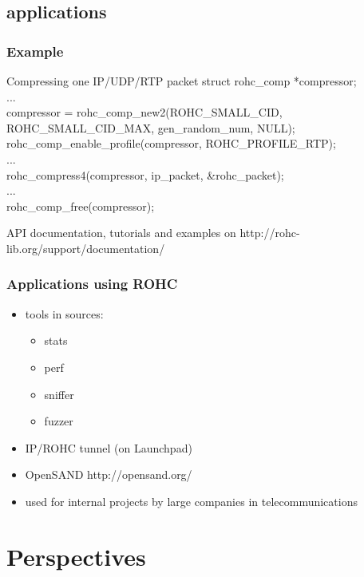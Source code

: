 \documentclass[utf8]{beamer}
\begin{document}
\subsection{applications}
\begin{frame}
	\frametitle{Example}
	\begin{block}{Compressing one IP/UDP/RTP packet}
	\tiny
	struct rohc\_comp *compressor;\\
	...\\
	compressor = rohc\_comp\_new2(ROHC\_SMALL\_CID, ROHC\_SMALL\_CID\_MAX,
	                              gen\_random\_num, NULL);\\
	rohc\_comp\_enable\_profile(compressor, ROHC\_PROFILE\_RTP);\\
	...\\
	rohc\_compress4(compressor, ip\_packet, \&rohc\_packet);\\
	...\\
	rohc\_comp\_free(compressor);\\
	\end{block}
	API documentation, tutorials and examples on http://rohc-lib.org/support/documentation/
\end{frame}
\begin{frame}
	\frametitle{Applications using ROHC}
	\begin{itemize}
		\item tools in sources:
			\begin{itemize}
				\item stats
				\item perf
				\item sniffer
				\item fuzzer
			\end{itemize}
		\item IP/ROHC tunnel (on Launchpad)
		\item OpenSAND {\tiny http://opensand.org/}
		\item used for internal projects by large companies in telecommunications
	\end{itemize}
\end{frame}



\section{Perspectives}
\end{document}
